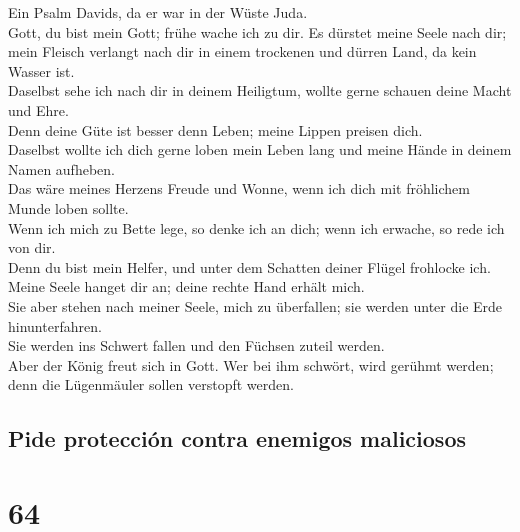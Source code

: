  Ein Psalm Davids, da er war in der Wüste Juda.\\
 Gott, du bist mein Gott; frühe wache ich zu dir. Es
dürstet meine Seele nach dir; mein Fleisch verlangt nach dir in einem
trockenen und dürren Land, da kein Wasser ist.\\
 Daselbst sehe ich nach dir in deinem Heiligtum, wollte
gerne schauen deine Macht und Ehre.\\
 Denn deine Güte ist besser denn Leben; meine Lippen
preisen dich.\\
 Daselbst wollte ich dich gerne loben mein Leben lang und
meine Hände in deinem Namen aufheben.\\
 Das wäre meines Herzens Freude und Wonne, wenn ich dich
mit fröhlichem Munde loben sollte.\\
 Wenn ich mich zu Bette lege, so denke ich an dich; wenn
ich erwache, so rede ich von dir.\\
 Denn du bist mein Helfer, und unter dem Schatten deiner
Flügel frohlocke ich.\\
 Meine Seele hanget dir an; deine rechte Hand erhält
mich.\\
 Sie aber stehen nach meiner Seele, mich zu überfallen;
sie werden unter die Erde hinunterfahren.\\
 Sie werden ins Schwert fallen und den Füchsen zuteil
werden.\\
 Aber der König freut sich in Gott. Wer bei ihm schwört,
wird gerühmt werden; denn die Lügenmäuler sollen verstopft werden.

\hypertarget{pide-protecciuxf3n-contra-enemigos-maliciosos}{%
\subsection{Pide protección contra enemigos
maliciosos}\label{pide-protecciuxf3n-contra-enemigos-maliciosos}}

\hypertarget{section-63}{%
\section{64}\label{section-63}}

